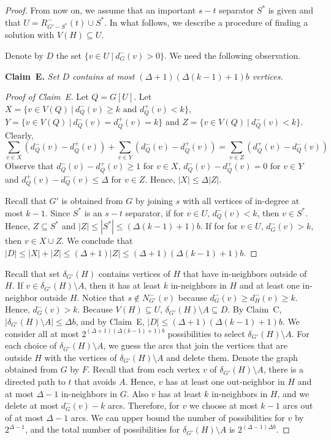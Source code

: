 \documentclass[11pt,a4paper]{article}
\begin{document}
\begin{proof}
\medskip
From now on, we assume that an important $s-t$ separator $S^*$ is given and that  $U= R_{G'-S^*}^-(t)\cup S^*$.
In what follows, we describe a procedure of finding  a solution with  $V(H)\subseteq U$.


\medskip
Denote by $D$ the set $\{v\in U\ |\ d_G^-(v)>0\}$. We need the following observation.



\medskip
\noindent
{\bf Claim~E.} {\it
Set $D$ contains at most $(\Delta+1) (\Delta(k-1)+1)b$ vertices.
}


\begin{proof}[Proof of Claim~E]
Let $Q=G[U]$. Let $X=\{v\in V(Q)\ |\ d_Q^-(v)\geq k\text{ and }d_Q^+(v)<k\}$, $Y=\{v\in V(Q)\ |\ d_Q^-(v)=d_Q^+(v)=k\}$ and
$Z=\{v\in V(Q)\ |\ d_Q^-(v)<k\}$. Clearly,
$$\sum_{v\in X}(d_Q^-(v)-d_Q^+(v))+ \sum_{v\in Y}(d_Q^-(v)-d_Q^+(v))=\sum_{v\in Z}(d_Q^+(v)-d_Q^-(v))$$
Observe that $d_Q^-(v)-d_Q^+(v)\geq 1$ for $v\in X$,  $d_Q^-(v)-d_Q^+(v)= 0$ for $v\in Y$ and $d_Q^+(v)-d_Q^-(v)\leq \Delta$
for $v\in Z$. Hence, $|X|\leq \Delta|Z|$.

Recall that $G'$ is obtained from $G$ by joining $s$ with all vertices of in-degree at most $k-1$. Since $S^*$ is an $s-t$
separator, if for $v\in U$, $d_Q^-(v)<k$, then $v\in S^*$. Hence, $Z\subseteq S^*$ and $|Z|\leq |S^*|\leq (\Delta(k-1)+1)b$.
If for for $v\in U$, $d_G^-(v)>k$, then $v\in X\cup Z$. We conclude that $|D|\leq|X|+|Z|\leq (\Delta+1)|Z|\leq (\Delta+1)
(\Delta(k-1)+1)b$.
\end{proof}

Recall   that  set $\delta_{G'}(H)$ contains vertices of $H$ that have in-neighbors outside of $H$. If $v\in
\delta_{G'}(H)\setminus A$, then it has at least $k$ in-neighbors in $H$ and at least one in-neighbor outside $H$. Notice that
$s\notin N_{G'}^-(v)$ because $d_G^-(v)\geq d_H^-(v)\geq k$. Hence, $d_G^-(v)>k$. Because $V(H)\subseteq U$,
$\delta_{G'}(H)\setminus A\subseteq D$. By Claim~C, $|\delta_{G'}(H)\setminus A|\leq \Delta b$, and by
Claim~E, $|D|\leq (\Delta+1) (\Delta(k-1)+1)b$.
We consider  all at most
$  2^{(\Delta+1) (\Delta(k-1)+1)b}$ possibilities to select  $\delta_{G'}(H)\setminus A$. For each choice of
$\delta_{G'}(H)\setminus A$, we guess the arcs that join the vertices that are outside $H$ with the vertices of
$\delta_{G'}(H)\setminus A$ and delete them. Denote the graph obtained from $G$ by $F$. Recall that from each vertex $v$ of
$\delta_{G'}(H)\setminus A$, there is a directed path to $t$ that avoids $A$. Hence, $v$ has at least one out-neighbor in $H$
and at most $\Delta-1$ in-neighbors in $G$. Also $v$ has at least $k$ in-neighbors in $H$, and we delete at most $d_G^-(v)-k$
arcs. Therefore, for $v$ we choose at most $k-1$ arcs out of at most $\Delta-1$ arcs. We can upper bound the number of
possibilities for $v$ by $2^{\Delta-1}$, and the total number of possibilities for $\delta_{G'}(H)\setminus A$ is
$2^{(\Delta-1)\Delta b}$.


\end{proof}
\end{document}
